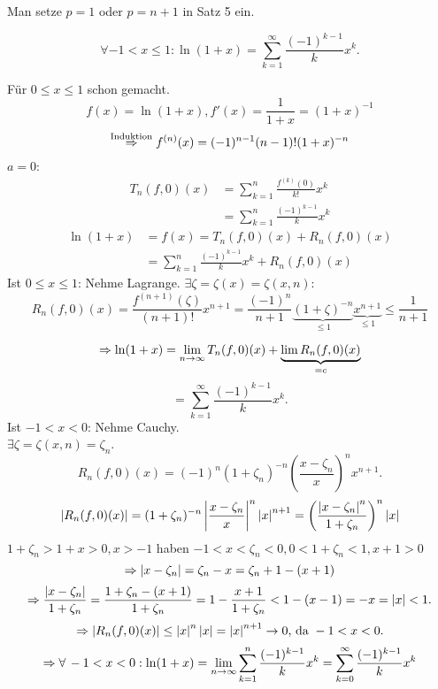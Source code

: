 \documentclass[../ana2.tex]{subfiles}
\begin{document}
\begin{bew}
    Man setze \( p=1 \) oder \( p=n+1 \) in Satz 5 ein.
\end{bew}
\begin{bsp}
    \[ \forall -1 < x \leq 1: \ln(1+x) 
    = \sum_{k=1}^\infty \frac{(-1)^{k-1}}{k} x^k. \]
\end{bsp}
\begin{bew}
    Für \( 0 \leq x \leq 1 \) schon gemacht.
    \[ f(x) = \ln(1+x), f'(x) = \frac{1}{1+x} 
    = (1+x)^{-1} \]
    \[ \overset{\text{Induktion}}{\Rightarrow} f^{(n)}(x) 
    = (-1)^{n-1}(n-1)!(1+x)^{-n} \]
    \( a=0 \):
    \begin{align*}
        T_n(f,0)(x) &= \sum_{k=1}^{n} \frac{f^{(k)}(0)}{k!} x^k \\
        &= \sum_{k=1}^{n} \frac{(-1)^{k-1}}{k} x^k         
    \end{align*}
    \begin{align*}
        \ln(1+x) &= f(x) = T_n(f,0)(x) + R_n(f,0)(x) \\
        &= \sum_{k=1}^{n} \frac{(-1)^{k-1}}{k} x^k + R_n(f, 0)(x)
    \end{align*}
    Ist \( 0 \leq x \leq 1 \): Nehme Lagrange. 
    \( \exists \zeta = \zeta(x) = \zeta(x,n) \): 
    \[ R_n(f,0)(x) = \frac{ f^{(n+1)}(\zeta) }{ (n+1)! } 
    x^{n+1} = \frac{(-1)^n}{n+1} \underbrace{(1 + \zeta)^{-n}}_{
        \leq 1
    } \underbrace{x^{n+1}}_{\leq 1} \leq \frac{1}{n+1} \]
    
    \[ \Rightarrow \ln(1+x) 
    = \lim\limits_{n\rightarrow\infty} T_n(f,0)(x) + \underbrace{\lim R_n(f,0)(x) }_{=c} \]
    \[ = \sum_{k=1}^\infty \frac{(-1)^{k-1}}{k} x^k. \]
    Ist \( -1 < x < 0 \): Nehme Cauchy. \\
    \( \exists \zeta = \zeta(x,n) = \zeta_n \).
    \[ R_n(f,0)(x) = (-1)^n (1+ \zeta_n)^{-n} 
    \left( \frac{x - \zeta_n}{x} \right)^n x^{n+1}. \]
    \[ \left|R_n(f,0)(x)\right| = (1 + \zeta_n)^{-n} 
    \left| \frac{x - \zeta_n}{x} \right|^n \left|x\right|^{n+1} 
    = \left( \frac{ \left|x - \zeta_n\right|^n }{1 + \zeta_n} 
    \right)^n \left|x\right| \]
    \( 1 + \zeta_n > 1 + x > 0, x > -1 \)
    haben \( -1 < x < \zeta_n < 0, 0 < 1+\zeta_n < 1, x+1 > 0 \) 
    \[ \Rightarrow \left|x-\zeta_n\right| = \zeta_n - x 
    = \zeta_n + 1 - (x+1) \]
    \[ \Rightarrow \frac{ \left|x - \zeta_n\right| }{ 1 + \zeta_n } 
    = \frac{ 1 + \zeta_n - (x+1) }{ 1 + \zeta_n } 
    = 1 - \frac{x + 1}{1 + \zeta_n} < 1 - (x-1) = -x 
    = \left|x\right| < 1. \]
    \[ \Rightarrow  \left|R_n(f,0)(x)\right| 
    \leq \left|x\right|^n \left|x\right| = \left|x\right|^{n+1} \rightarrow 0 
    \text{, da } -1 < x < 0. \]
    \[ \Rightarrow \forall -1 < x < 0: \ln(1+x) 
    = \limes{n} \sum_{k=1}^{n} \frac{(-1)^{k-1}}{k} x^k
    = \sum_{k=0}^{\infty} \frac{(-1)^{k-1}}{k} x^k \]
\end{bew}
\end{document}
